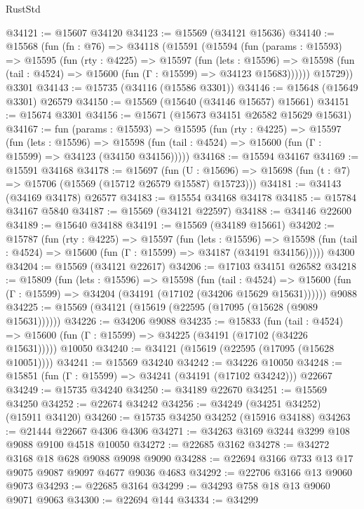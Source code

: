 \begin{lexlean}{RustStd}
\begin{coremodule}
@34121 := @15607 @34120
@34123 := @15569 (@34121 @15636)
@34140 := @15568
    (fun (fn : @76) =>
    @34118
      (@15591
        (@15594
          (fun (params : @15593) =>
          @15595
            (fun (rty : @4225) =>
            @15597
              (fun (lets : @15596) =>
              @15598 (fun (tail : @4524) => @15600 (fun (Γ : @15599) => @34123 @15683))))))
        @15729))
    @3301
@34143 := @15735 (@34116 (@15586 @3301))
@34146 := @15648 (@15649 @3301) @26579
@34150 := @15569 (@15640 (@34146 @15657) @15661)
@34151 := @15674 @3301
@34156 := @15671 (@15673 @34151 @26582 @15629 @15631)
@34167 := fun (params : @15593) =>
  @15595
    (fun (rty : @4225) =>
    @15597
      (fun (lets : @15596) =>
      @15598 (fun (tail : @4524) => @15600 (fun (Γ : @15599) => @34123 (@34150 @34156)))))
@34168 := @15594 @34167
@34169 := @15591 @34168
@34178 := @15697
    (fun (U : @15696) => @15698 (fun (t : @7) => @15706 (@15569 (@15712 @26579 @15587) @15723)))
@34181 := @34143 (@34169 @34178) @26577
@34183 := @15554 @34168 @34178
@34185 := @15784 @34167 @5840
@34187 := @15569 (@34121 @22597)
@34188 := @34146 @22600
@34189 := @15640 @34188
@34191 := @15569 (@34189 @15661)
@34202 := @15787
    (fun (rty : @4225) =>
    @15597
      (fun (lets : @15596) =>
      @15598 (fun (tail : @4524) => @15600 (fun (Γ : @15599) => @34187 (@34191 @34156)))))
    @4300
@34204 := @15569 (@34121 @22617)
@34206 := @17103 @34151 @26582
@34218 := @15809
    (fun (lets : @15596) =>
    @15598
      (fun (tail : @4524) =>
      @15600 (fun (Γ : @15599) => @34204 (@34191 (@17102 (@34206 @15629 @15631))))))
    @9088
@34225 := @15569 (@34121 (@15619 (@22595 (@17095 (@15628 (@9089 @15631))))))
@34226 := @34206 @9088
@34235 := @15833
    (fun (tail : @4524) => @15600 (fun (Γ : @15599) => @34225 (@34191 (@17102 (@34226 @15631)))))
    @10050
@34240 := @34121 (@15619 (@22595 (@17095 (@15628 @10051))))
@34241 := @15569 @34240
@34242 := @34226 @10050
@34248 := @15851 (fun (Γ : @15599) => @34241 (@34191 (@17102 @34242))) @22667
@34249 := @15735 @34240
@34250 := @34189 @22670
@34251 := @15569 @34250
@34252 := @22674 @34242
@34256 := @34249 (@34251 @34252) (@15911 @34120)
@34260 := @15735 @34250 @34252 (@15916 @34188)
@34263 := @21444 @22667 @4306 @4306
@34271 := @34263 @3169 @3244 @3299 @108 @9088 @9100 @4518 @10050
@34272 := @22685 @3162
@34278 := @34272 @3168 @18 @628 @9088 @9098 @9090
@34288 := @22694 @3166 @733 @13 @17 @9075 @9087 @9097 @4677 @9036 @4683
@34292 := @22706 @3166 @13 @9060 @9073
@34293 := @22685 @3164
@34299 := @34293 @758 @18 @13 @9060 @9071 @9063
@34300 := @22694 @144
@34334 := @34299

\end{coremodule}
\end{lexlean}
